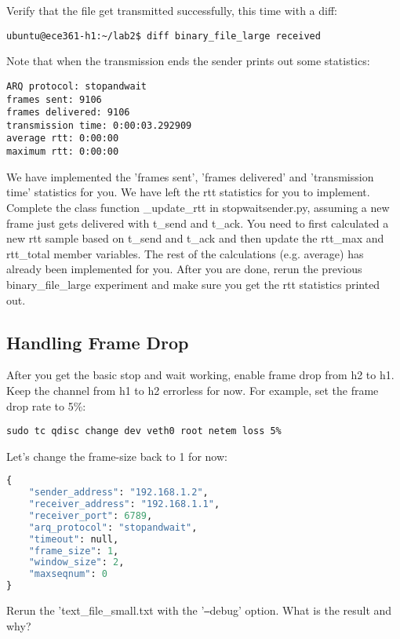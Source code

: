 \documentclass[11pt]{article}
\begin{document}

Verify that the file get transmitted successfully, this time with a diff:
\begin{lstlisting}[style=ece361shell, caption={}]
ubuntu@ece361-h1:~/lab2$ diff binary_file_large received
\end{lstlisting}

Note that when the transmission ends the sender prints out some statistics:

\begin{lstlisting}[style=ece361shell, caption={}]
ARQ protocol: stopandwait
frames sent: 9106
frames delivered: 9106
transmission time: 0:00:03.292909
average rtt: 0:00:00
maximum rtt: 0:00:00
\end{lstlisting}

We have implemented the 'frames sent', 'frames delivered' and 'transmission time' statistics for you. We have left the rtt statistics for you to implement. Complete the class function \_update\_rtt in stopwaitsender.py, assuming a new frame just gets delivered with t\_send and t\_ack. You need to first calculated a new rtt sample based on t\_send and t\_ack and then update the rtt\_max and rtt\_total member variables. The rest of the calculations (e.g. average) has already been implemented for you. After you are done, rerun the previous binary\_file\_large experiment and make sure you get the rtt statistics printed out.

\subsection{Handling Frame Drop}
After you get the basic stop and wait working, enable frame drop from h2 to h1. Keep the channel from h1 to h2 errorless for now. For example, set the frame drop rate to 5\%:
\begin{lstlisting}[style=ece361shell, caption={}]
sudo tc qdisc change dev veth0 root netem loss 5%
\end{lstlisting}
Let's change the frame-size back to 1 for now:

\begin{minipage}{\linewidth}
\begin{lstlisting}[caption={Configuration For Large File}, language=python]
{
    "sender_address": "192.168.1.2",
    "receiver_address": "192.168.1.1",
    "receiver_port": 6789,
    "arq_protocol": "stopandwait",
    "timeout": null,
    "frame_size": 1,
    "window_size": 2,
    "maxseqnum": 0
}
\end{lstlisting}
\end{minipage}
Rerun the 'text\_file\_small.txt with the '\texttt{--}debug' option. What is the result and why?
\end{document}
